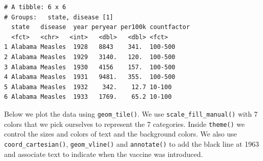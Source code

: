 \documentclass[
  letterpaper,
  DIV=11,
  numbers=noendperiod]{scrreprt}
\begin{document}
\begin{verbatim}
# A tibble: 6 x 6
# Groups:   state, disease [1]
  state   disease  year peryear per100k countfactor
  <fct>   <chr>   <int>   <dbl>   <dbl> <fct>      
1 Alabama Measles  1928   8843    341.  100-500    
2 Alabama Measles  1929   3140.   120.  100-500    
3 Alabama Measles  1930   4156    157.  100-500    
4 Alabama Measles  1931   9481.   355.  100-500    
5 Alabama Measles  1932    342.    12.7 10-100     
6 Alabama Measles  1933   1769.    65.2 10-100     
\end{verbatim}

Below we plot the data using \texttt{geom\_tile()}. We use
\texttt{scale\_fill\_manual()} with 7 colors that we pick ourselves to
represent the 7 categories. Inside \texttt{theme()} we control the sizes
and colors of text and the background colors. We also use
\texttt{coord\_cartesian()}, \texttt{geom\_vline()} and
\texttt{annotate()} to add the black line at 1963 and associate text to
indicate when the vaccine was introduced.
\end{document}
